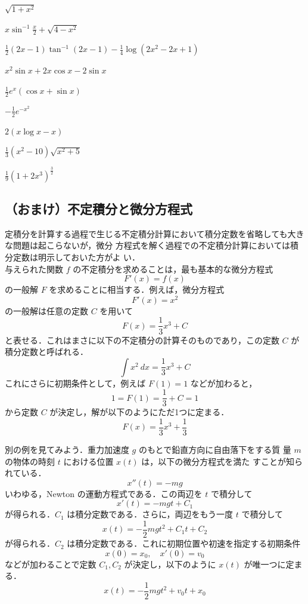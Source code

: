 \documentclass[10pt, uplatex, dvipdfmx]{jsarticle}
\theoremstyle{definition}
\numberwithin{equation}{section}
\newcommand{\ds}{\displaystyle}
\begin{document}
\begin{edaenumerate}
\item $\ds \sqrt{1+x^2}$

\item $\ds x\sin^{-1}\frac{x}{2} + \sqrt{4-x^2}$

\item<1> $\ds \frac{1}{2}\left(2x-1\right)\tan^{-1}\left(2x-1\right)-\frac{1}{4}\log \left(2x^2-2x+1\right)$ 

\item<2> $\ds x^2\sin x + 2x\cos x - 2 \sin x$

\item $\ds \frac{1}{2}e^x\left( \cos x + \sin x\right)$

\item $\ds -\frac{1}{2}e^{-x^2}$

\item $\ds 2 \left( x \log x - x\right)$

\item $\ds \frac{1}{3}\left(x^2-10 \right)\sqrt{x^2+5}$

\item $\ds \frac{1}{9} \left(1+2x^3\right)^{\frac{3}{2}}$

\end{edaenumerate}

\newpage

\subsection{（おまけ）不定積分と微分方程式}

定積分を計算する過程で生じる不定積分計算において積分定数を省略しても大きな問題は起こらないが，微分
方程式を解く過程での不定積分計算においては積分定数は明示しておいた方がよ
い．\\

与えられた関数 $f$ の不定積分を求めることは，最も基本的な微分方程式
\[
  F'(x) = f(x)
\]
の一般解 $F$ を求めることに相当する．例えば，微分方程式
\[
  F'(x) = x^2
\]
の一般解は任意の定数 $C$ を用いて
\[
  F(x) = \frac{1}{3}x^3 + C 
\]
と表せる．これはまさに以下の不定積分の計算そのものであり，この定数 $C$ が積分定数と呼ばれる．
\[
  \int x^2 \ dx = \frac{1}{3} x^3 +C
\]
これにさらに初期条件として，例えば $F(1) = 1$ などが加わると，
\[
  1=F(1) = \frac{1}{3}+C= 1
\]
から定数 $C$ が決定し，解が以下のようにただ1つに定まる．
\[
  F(x) = \frac{1}{3}x^3 + \frac{1}{3}
\]

別の例を見てみよう．重力加速度 $g$ のもとで鉛直方向に自由落下をする質
量 $m$ の物体の時刻 $t$ における位置 $x(t)$ は，以下の微分方程式を満た
すことが知られている．
\[
  x''(t) = -mg
\]
いわゆる，Newton の運動方程式である．この両辺を $t$ で積分して
\[
  x'(t) = -mg t +C_1
\]
が得られる．$C_1$ は積分定数である．さらに，両辺をもう一度 $t$ で積分して
\[
  x(t) = -\frac{1}{2}mg t^2 + C_1 t + C_2
\]
が得られる．$C_2$ は積分定数である．これに初期位置や初速を指定する初期条件
\[
  x(0) = x_0, \quad x'(0)= v_0
\]
などが加わることで定数 $C_1, C_2$ が決定し，以下のように $x(t)$ が唯一つに定まる．
\[
  x(t) = -\frac{1}{2}mg t^2 + v_0 t + x_0
\]
\end{document}
